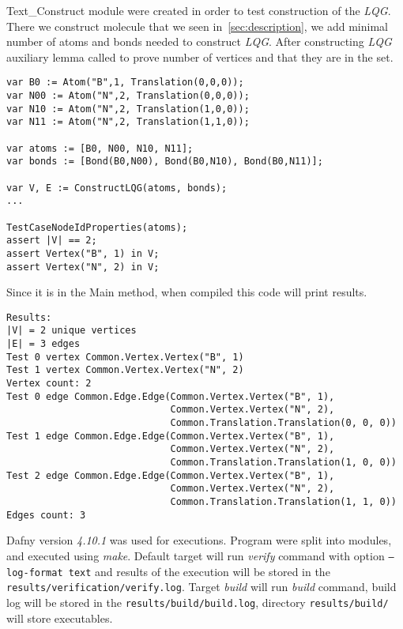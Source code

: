Text\_Construct module were created in order to test construction of the \textit{LQG}. There we construct molecule that we seen in~\ref{sec:description}, we add minimal number of atoms and bonds needed to construct \textit{LQG}. After constructing \textit{LQG} auxiliary lemma called to prove number of vertices and that they are in the set.

\begin{lstlisting}[caption={Test construction of \textit{LQG} from molecule},label={lst:molecule}]
var B0 := Atom("B",1, Translation(0,0,0));
var N00 := Atom("N",2, Translation(0,0,0));
var N10 := Atom("N",2, Translation(1,0,0));
var N11 := Atom("N",2, Translation(1,1,0));

var atoms := [B0, N00, N10, N11];
var bonds := [Bond(B0,N00), Bond(B0,N10), Bond(B0,N11)];

var V, E := ConstructLQG(atoms, bonds);
...

TestCaseNodeIdProperties(atoms);
assert |V| == 2;
assert Vertex("B", 1) in V;
assert Vertex("N", 2) in V;
\end{lstlisting}

Since it is in the Main method, when compiled this code will print results.

\begin{verbatim}
Results:
|V| = 2 unique vertices
|E| = 3 edges
Test 0 vertex Common.Vertex.Vertex("B", 1)
Test 1 vertex Common.Vertex.Vertex("N", 2)
Vertex count: 2
Test 0 edge Common.Edge.Edge(Common.Vertex.Vertex("B", 1),
                             Common.Vertex.Vertex("N", 2),
                             Common.Translation.Translation(0, 0, 0))
Test 1 edge Common.Edge.Edge(Common.Vertex.Vertex("B", 1),
                             Common.Vertex.Vertex("N", 2),
                             Common.Translation.Translation(1, 0, 0))
Test 2 edge Common.Edge.Edge(Common.Vertex.Vertex("B", 1),
                             Common.Vertex.Vertex("N", 2),
                             Common.Translation.Translation(1, 1, 0))
Edges count: 3
\end{verbatim}

Dafny version \textit{4.10.1} was used for executions. Program were split into modules, and executed using \textit{make}. Default target will run \textit{verify} command with option \texttt{--log-format text} and results of the execution will be stored in the \texttt{results/verification/verify.log}. Target \textit{build} will run \textit{build} command, build log will be stored in the \texttt{results/build/build.log}, directory \texttt{results/build/} will store executables.
